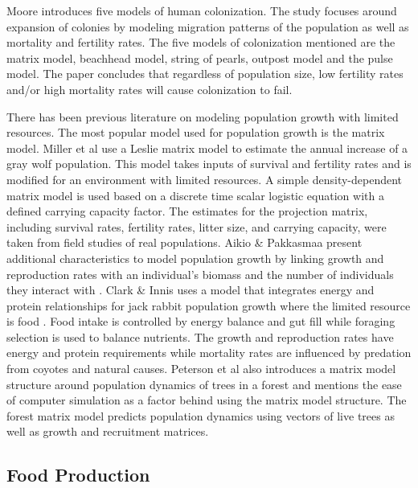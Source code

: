 \documentclass[12pt]{article}
\begin{document}
Moore \cite{moore2001evaluating} introduces five models of human
colonization. The study focuses around expansion of colonies by modeling
migration patterns of the population as well as mortality and fertility rates.
The five models of colonization mentioned are the matrix model, beachhead
model, string of pearls, outpost model and the pulse model. The paper
concludes that regardless of population size, low fertility rates and/or high
mortality rates will cause colonization to fail.

There has been previous literature on modeling population growth with limited
resources. The most popular model used for population growth is the matrix
model.  Miller et al \cite{miller2002density} use a Leslie matrix
model to estimate the annual increase of a gray wolf population. This model
takes inputs of survival and fertility rates and is modified for an environment
with limited resources. A simple density-dependent matrix model is used based
on a discrete time scalar logistic equation with a defined carrying capacity
factor. The estimates for the projection matrix, including survival rates,
fertility rates, litter size, and carrying capacity, were taken from field
studies of real populations. Aikio \& Pakkasmaa present additional
characteristics to model population growth by linking growth and reproduction
rates with an individual's biomass and the number of individuals they
interact with \cite{aikio2003relatedness}. Clark \& Innis uses a model that
integrates energy and protein relationships for jack rabbit population growth
where the limited resource is food \cite{clark1982forage}. Food intake is
controlled by energy balance and gut fill while foraging selection is used to
balance nutrients. The growth and reproduction rates have energy and protein
requirements while mortality rates are influenced by predation from coyotes and
natural causes.  Peterson et al \cite{peterson2014modeling} also introduces a
matrix model structure around population dynamics of trees in a forest and
mentions the ease of computer simulation as a factor behind using the matrix
model structure. The forest matrix model predicts population dynamics using
vectors of live trees as well as growth and recruitment matrices.

\subsection{Food Production}
\end{document}
